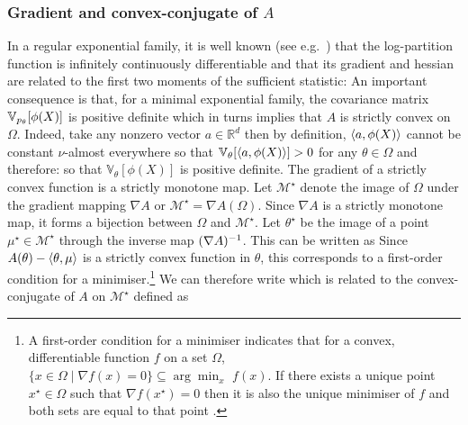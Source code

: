 \subsubsection{Gradient and convex-conjugate of $A$}
In a regular exponential family, it is well known (see e.g.\ \citet[theorem 2.2]{brown86}) that the log-partition function is infinitely continuously differentiable and that its gradient and hessian are related to the first two moments of the sufficient statistic:
%
%
An important consequence is that, for a minimal exponential family, the covariance matrix $\mathbb V_{p_\theta}[\phi(X)]$ is positive definite which in turns implies that $A$ is strictly convex on $\Omega$. Indeed, take any nonzero vector $a\in\mathbb R^{d}$ then by definition, $\left\langle a,\phi(X) \right\rangle$ cannot be constant $\nu$-almost everywhere so that $\mathbb V_\theta[\left\langle a,\phi(X) \right\rangle] > 0$ for any $\theta\in\Omega$ and therefore:
so that $\mathbb V_\theta[\phi(X)]$ is positive definite. The gradient of a strictly convex function is a strictly monotone map. Let $\mathcal M^{\star}$ denote the image of $\Omega$ under the gradient mapping $\nabla A$ or $\mathcal M^{\star}=\nabla A(\Omega)$. Since $\nabla A$ is a strictly monotone map, it forms a bijection between $\Omega$ and $\mathcal M^{\star}$. Let $\theta^{\star}$ be the image of a point $\mu^{\star}\in\mathcal M^{\star}$ through the inverse map $(\nabla A)^{-1}$. This can be written as
%
%
Since $A(\theta)-\left\langle \theta,\mu \right\rangle$ is a strictly convex function in $\theta$, this corresponds to a first-order condition for a minimiser.\footnote{A first-order condition for a minimiser indicates that for a convex, differentiable function $f$ on a set $\Omega$, $\{x\in\Omega\mid \nabla f(x)=0 \}\subseteq\arg\min_{x}\,\,f(x)$. If there exists a unique point $x^{\star}\in\Omega$ such that $\nabla f(x^{\star})=0$ then it is also the unique minimiser of $f$ and both sets are equal to that point \citep[theorem 27.1]{rockafellar70}. } We can therefore write
%
%
which is related to the convex-conjugate of $A$ on $\mathcal M^{\star}$ defined as
